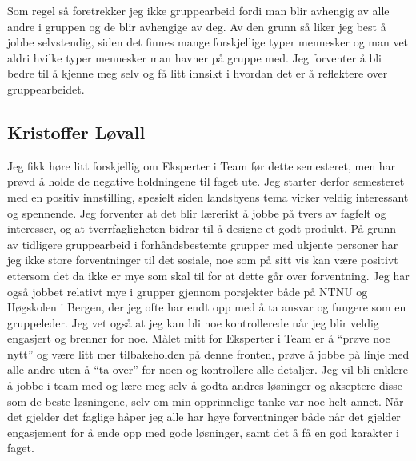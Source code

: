 Som regel så foretrekker jeg ikke gruppearbeid fordi man blir avhengig av alle andre i gruppen og de blir avhengige av deg. 
Av den grunn så liker jeg best å jobbe selvstendig, siden det finnes mange forskjellige typer mennesker og man vet aldri 
hvilke typer mennesker man havner på gruppe med. Jeg forventer å bli bedre til å kjenne meg selv og få litt innsikt i 
hvordan det er å reflektere over gruppearbeidet.

\subsection*{Kristoffer Løvall}
Jeg fikk høre litt forskjellig om Eksperter i Team før dette semesteret, men har 
prøvd å holde de negative holdningene til faget ute. Jeg starter derfor semesteret med en positiv innstilling, spesielt siden landsbyens tema 
virker veldig interessant og spennende. Jeg forventer at det blir lærerikt å 
jobbe på tvers av fagfelt og interesser, og at tverrfagligheten bidrar til å 
designe et godt produkt. På grunn av tidligere gruppearbeid i forhåndsbestemte 
grupper med ukjente personer har jeg ikke store forventninger til det sosiale, 
noe som på sitt vis kan være positivt ettersom det da ikke er mye som skal til 
for at dette går over forventning. Jeg har også jobbet relativt mye i grupper 
gjennom porsjekter både på NTNU og Høgskolen i Bergen, der jeg ofte har endt opp 
med å ta ansvar og fungere som en gruppeleder. Jeg vet også at jeg kan bli noe 
kontrollerede når jeg blir veldig engasjert og brenner for noe.  Målet mitt for 
Eksperter i Team er å ``prøve noe nytt'' og være litt mer tilbakeholden på denne 
fronten, prøve å jobbe på linje med alle andre uten å ``ta over'' for noen og 
kontrollere alle detaljer. Jeg vil bli enklere å jobbe i team med og lære meg 
selv å godta andres løsninger og akseptere disse som de beste løsningene, selv om 
min opprinnelige tanke var noe helt annet. Når det gjelder det faglige håper jeg 
alle har høye forventninger både når det gjelder engasjement for å ende opp med 
gode løsninger, samt det å få en god karakter i faget.

